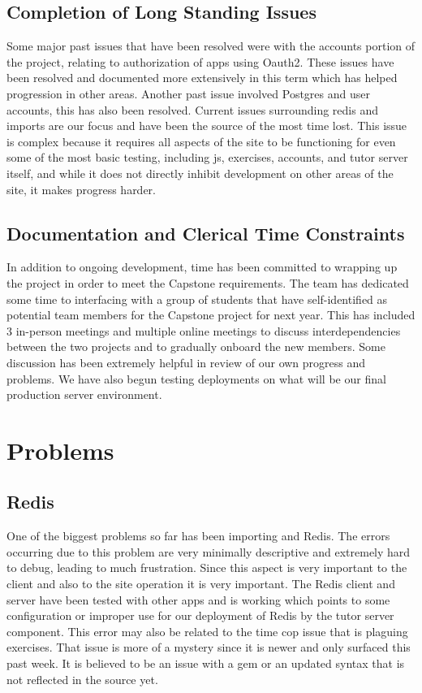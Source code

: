 \documentclass[onecolumn, draftclsnofoot,10pt, compsoc]{IEEEtran}
\begin{document}
\subsection{Completion of Long Standing Issues}
Some major past issues that have been resolved were with the accounts portion of the project, relating to authorization of apps using Oauth2. These issues have been resolved and documented more extensively in this term which has helped progression in other areas. Another past issue involved Postgres and user accounts, this has also been resolved. Current issues surrounding redis and imports are our focus and have been the source of the most time lost. This issue is complex because it requires all aspects of the site to be functioning for even some of the most basic testing, including js, exercises, accounts, and tutor server itself, and while it does not directly inhibit development on other areas of the site, it makes progress harder. 

\subsection{Documentation and Clerical Time Constraints}
In addition to ongoing development, time has been committed to wrapping up the project in order to meet the Capstone requirements. The team has dedicated some time to interfacing with a group of students that have self-identified as potential team members for the Capstone project for next year. This has included 3 in-person meetings and multiple online meetings to discuss interdependencies between the two projects and to gradually onboard the new members. Some discussion has been extremely helpful in review of our own progress and problems. We have also begun testing deployments on what will be our final production server environment. 


\section{Problems}
\subsection{Redis}
One of the biggest problems so far has been importing and Redis. The errors occurring due to this problem are very minimally descriptive and extremely hard to debug, leading to much frustration. Since this aspect is very important to the client and also to the site operation it is very important. The Redis client and server have been tested with other apps and is working which points to some configuration or improper use for our deployment of Redis by the tutor server component. This error may also be related to the time cop issue that is plaguing exercises. That issue is more of a mystery since it is newer and only surfaced this past week. It is believed to be an issue with a gem or an updated syntax that is not reflected in the source yet. 
\end{document}
